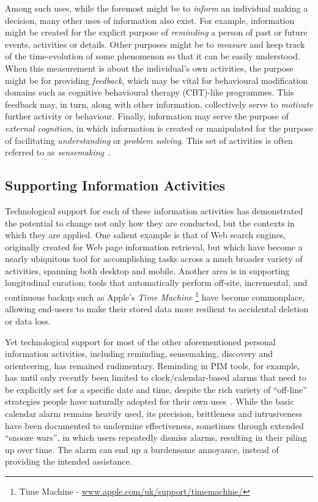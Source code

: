 \documentclass[graybox]{svmult}
\begin{document}

Among such uses, while the foremost might be to \emph{inform} an individual making a decision, many other uses of information also exist.  For example, information might be created for the explicit purpose of \emph{reminding} a person of past or future events, activities or details. Other purposes might be to \emph{measure} and keep track of the time-evolution of some phenomenon so that it can be easily understood.  When this measurement is about the individual's own activities, the purpose might be for providing \emph{feedback}, which may be vital for behavioural modification domains such as cognitive behavioural therapy (CBT)-like programmes.  This feedback may, in turn, along with other information, collectively serve to \emph{motivate} further activity or behaviour.  Finally, information may serve the purpose of \emph{external cognition}, in which information is created or manipulated for the purpose of facilitating \emph{understanding} or \emph{problem solving}.  This set of activities is often referred to as \emph{sensemaking}~\cite{pirolli2005sensemaking}.

\subsection{Supporting Information Activities}

Technological support for each of these information activities has demonstrated the potential to change not only how they are conducted, but the contexts in which they are applied.  One salient example is that of Web search engines, originally created for Web page information retrieval, but which have become a nearly ubiquitous tool for accomplishing tasks across a much broader variety of activities, spanning both desktop and mobile.   Another area is in supporting longitudinal curation; tools that automatically perform off-site, incremental, and continuous backup such as Apple's \emph{Time Machine} \footnote{Time Machine - \url{www.apple.com/uk/support/timemachine/‎}} have become commonplace, allowing end-users to make their stored data more resilient to accidental deletion or data loss.

Yet technological support for most of the other aforementioned personal information activities, including reminding, sensemaking, discovery and orienteering, has remained rudimentary.  Reminding in PIM tools, for example, has until only recently been limited to clock/calendar-based alarms that need to be explicitly set for a specific date and time, despite the rich variety of ``off-line'' strategies people have naturally adopted for their own uses~\cite{bellotti2004studies}.  While the basic calendar alarm remains heavily used, its precision, brittleness and intrusiveness have been documented to undermine effectiveness, sometimes through extended  ``snooze wars'', in which users repeatedly dismiss alarms, resulting in their piling up over time.  The alarm can end up a burdensome annoyance, instead of providing the intended assistance.  
\end{document}
